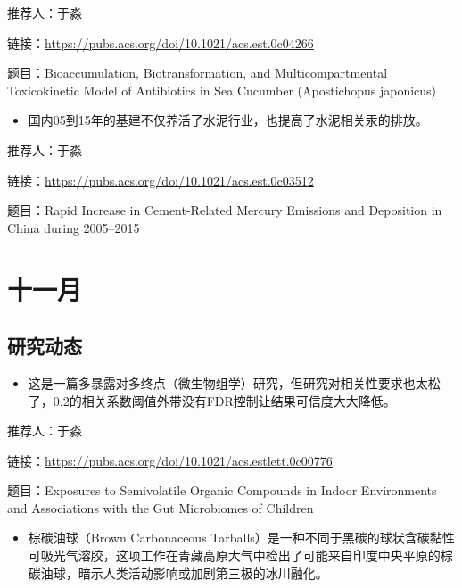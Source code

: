 \documentclass[
]{book}
\providecommand{\tightlist}{%
  \setlength{\itemsep}{0pt}\setlength{\parskip}{0pt}}
\begin{document}
推荐人：于淼

链接：\url{https://pubs.acs.org/doi/10.1021/acs.est.0c04266}

题目：Bioaccumulation, Biotransformation, and Multicompartmental Toxicokinetic Model of Antibiotics in Sea Cucumber (Apostichopus japonicus)

\begin{itemize}
\tightlist
\item
  国内05到15年的基建不仅养活了水泥行业，也提高了水泥相关汞的排放。
\end{itemize}

推荐人：于淼

链接：\url{https://pubs.acs.org/doi/10.1021/acs.est.0c03512}

题目：Rapid Increase in Cement-Related Mercury Emissions and Deposition in China during 2005--2015

\hypertarget{ux5341ux4e00ux6708-3}{%
\section*{十一月}\label{ux5341ux4e00ux6708-3}}

\hypertarget{ux7814ux7a76ux52a8ux6001-36}{%
\subsection*{研究动态}\label{ux7814ux7a76ux52a8ux6001-36}}

\begin{itemize}
\tightlist
\item
  这是一篇多暴露对多终点（微生物组学）研究，但研究对相关性要求也太松了，0.2的相关系数阈值外带没有FDR控制让结果可信度大大降低。
\end{itemize}

推荐人：于淼

链接：\url{https://pubs.acs.org/doi/10.1021/acs.estlett.0c00776}

题目：Exposures to Semivolatile Organic Compounds in Indoor Environments and Associations with the Gut Microbiomes of Children

\begin{itemize}
\tightlist
\item
  棕碳油球（Brown Carbonaceous Tarballs）是一种不同于黑碳的球状含碳黏性可吸光气溶胶，这项工作在青藏高原大气中检出了可能来自印度中央平原的棕碳油球，暗示人类活动影响或加剧第三极的冰川融化。
\end{itemize}
\end{document}
